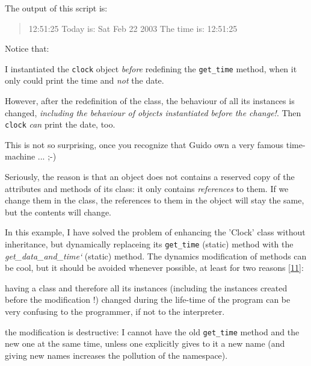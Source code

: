 \documentclass[10pt,english]{article}
\newcommand{\titlereference}[1]{\textsl{#1}}
\begin{document}
The output of this script is:
\begin{quote}

12:51:25
Today is: Sat Feb 22 2003 
The time is: 12:51:25
\end{quote}

Notice that:
\begin{list}{.}
{
\setlength{\rightmargin}{\leftmargin}
}
\item {} 
I instantiated the \texttt{clock} object \emph{before} redefining the \texttt{get{\_}time}
method, when it only could print the time and \emph{not} the date.

\item {} 
However, after the redefinition of the class, the behaviour of all its 
instances is changed, \emph{including the behaviour of objects instantiated 
before the change!}. Then \texttt{clock} \emph{can} print the date, too.

\end{list}

This is not so surprising, once you recognize that Guido own a very famous
time-machine ... ;-)

Seriously, the reason is that an object does not contains a reserved copy
of the attributes and methods of its class: it only contains \emph{references}
to them. If we change them in the class, the references to them in the
object will stay the same, but the contents will change.

In this example, I have solved the problem of enhancing the 'Clock' class
without inheritance, but dynamically replaceing its \texttt{get{\_}time} 
(static) method with the \titlereference{get{\_}data{\_}and{\_}time`} (static) method. 
The dynamics modification of methods can be cool, but it should be avoided 
whenever possible, at least for two reasons [\hyperlink{id22}{11}]:
\begin{list}{.}
{
\setlength{\rightmargin}{\leftmargin}
}
\item {} 
having a class and therefore all its instances (including the instances
created before the modification !) changed during the life-time of the
program can be very confusing to the programmer, if not to the interpreter.

\item {} 
the modification is destructive: I cannot have the old \texttt{get{\_}time} method
and the new one at the same time, unless one explicitly gives to it 
a new name (and giving new names increases the pollution of the namespace).

\end{list}
\end{document}
